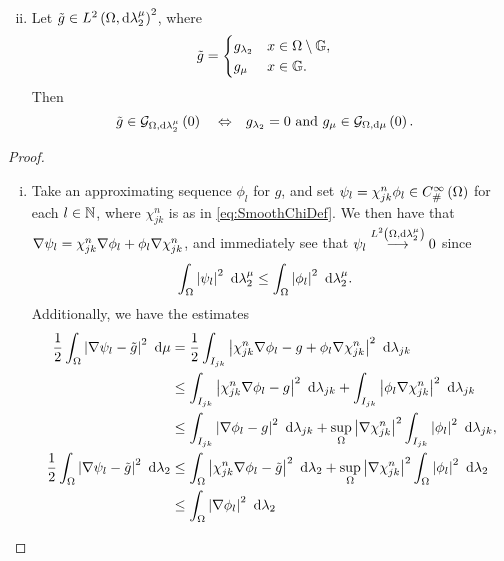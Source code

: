 \begin{prop}
\begin{enumerate}[(i)]
\begin{align*}
		\end{align*}
		\item Let $\tilde{g}\in L^{2}\left( \Omega,\mathrm{d} \lambda_2^{\mu} \right)^2$, where
	\begin{align*}
		\tilde{g} &= \begin{cases} g_{\lambda_2} & x\in\Omega\setminus\mathbb{G}, \\ g_{\mu} & x\in\mathbb{G}. \end{cases}
	\end{align*}
	Then
	\begin{align*}
		\tilde{g}\in\mathcal{G}_{ \Omega, \mathrm{d}\lambda_2^{\mu}}\left( 0 \right)
		\quad\Leftrightarrow\quad &
		g_{\lambda_2} = 0 \text{ and } g_{\mu}\in\mathcal{G}_{ \Omega, \mathrm{d}\mu}\left( 0 \right).
	\end{align*}
	\end{enumerate}
\end{prop}
\begin{proof}
	\begin{enumerate}[(i)]
		\item Take an approximating sequence $\phi_l$ for $g$, and set $\psi_l = \chi_{jk}^n\phi_l\in C^{\infty}_{\#}\left( \Omega \right)$ for each $l\in\mathbb{N}$, where $\chi_{jk}^n$ is as in \eqref{eq:SmoothChiDef}.
		We then have that $\nabla\psi_l = \chi_{jk}^n\nabla\phi_l + \phi_l\nabla\chi_{jk}^n$, and immediately see that $\psi_l\overset{L^{2}\left( \Omega,\mathrm{d} \lambda_2^{\mu} \right)}{\longrightarrow}0$ since
		\begin{align*}
			\int_{\Omega}\left\lvert  \psi_l  \right\rvert^2 \ \mathrm{d}\lambda_2^{\mu}
			&\leq \int_{\Omega}\left\lvert  \phi_l  \right\rvert^2 \ \mathrm{d}\lambda_2^{\mu}.
		\end{align*}
		Additionally, we have the estimates
		\begin{align*}
			\recip{2}\integral{\ddom}{\abs{ \grad\psi_l - \tilde{g} }^2}{\ddmes}
			&= \recip{2}\integral{I_{jk}}{\abs{ \chi_{jk}^n\grad\phi_l - g  + \phi_l\grad\chi_{jk}^n }^2}{\lambda_{jk}} \\
			&\leq \integral{I_{jk}}{\abs{ \chi_{jk}^n\grad\phi_l - g }^2}{\lambda_{jk}}
			+ \integral{I_{jk}}{\abs{ \phi_l\grad\chi_{jk}^n }^2}{\lambda_{jk}} \\
			&\leq \integral{I_{jk}}{\abs{ \grad\phi_l - g }^2}{\lambda_{jk}}
			+ \sup_{\ddom}\abs{\grad\chi_{jk}^n}^2 \integral{I_{jk}}{\abs{ \phi_l }^2}{\lambda_{jk}}, \\
			\recip{2}\integral{\ddom}{\abs{ \grad\psi_l - \tilde{g} }^2}{\lambda_2}
			&\leq \integral{\ddom}{\abs{ \chi_{jk}^n\grad\phi_l - \tilde{g} }^2}{\lambda_2}
			+ \sup_{\ddom}\abs{\grad\chi_{jk}^n}^2 \integral{\ddom}{\abs{ \phi_l }^2}{\lambda_2} \\
			&\leq \integral{\ddom}{\abs{ \grad\phi_l }^2}{\lambda_2}

\end{align*}
\end{enumerate}
\end{proof}
